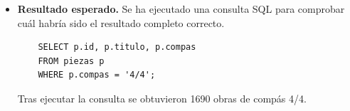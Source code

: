 \begin{itemize}
*   **IE-2019-D-HLS-001** (Tonalidad: G major)
*   **IE-2019-D-HLS-002** (Tonalidad: G major, BPM: 62)
*   **IE-2019-D-HLS-003** (Tonalidad: G major, BPM: 140)
*   **IE-2019-D-HLS-007** (Tonalidad: G major)
*   **IE-2019-D-HLS-010** (Tonalidad: G major, BPM: 128)
*   **IE-2019-D-HLS-011** (Tonalidad: G major, BPM: 128)
*   **IE-2019-D-HLS-013** (Tonalidad: G major, BPM: 140)
*   **IE-2019-D-HLS-016** (Tonalidad: C major)
*   **IE-2019-D-HLS-017** (Tonalidad: G major)
*   **IE-2019-D-HLS-018** (Tonalidad: G major, BPM: 70)"
    \item \textbf{Resultado esperado.} Se ha ejecutado una consulta SQL para comprobar cuál habría sido el resultado completo correcto.
    \begin{verbatim}
    SELECT p.id, p.titulo, p.compas
    FROM piezas p
    WHERE p.compas = '4/4';
    \end{verbatim}
    Tras ejecutar la consulta se obtuvieron 1690 obras de compás 4/4.




\end{itemize}
